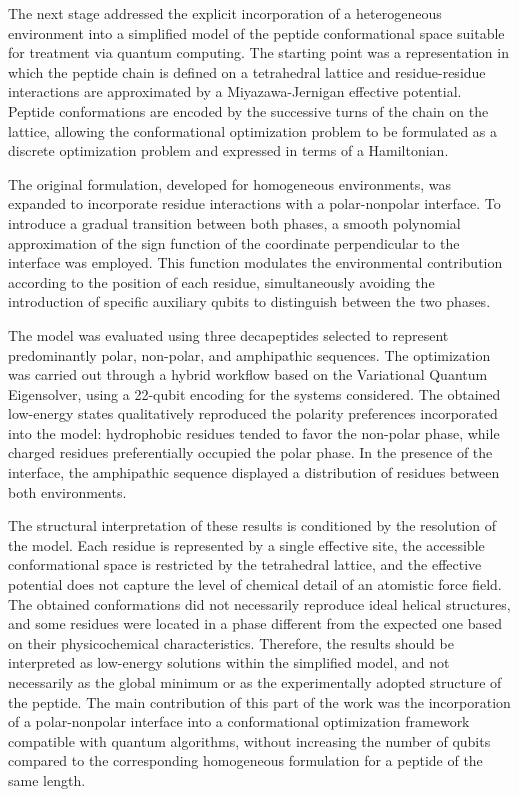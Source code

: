 The next stage addressed the explicit incorporation of a heterogeneous environment into a simplified model of the peptide conformational space suitable for treatment via quantum computing. The starting point was a representation in which the peptide chain is defined on a tetrahedral lattice and residue-residue interactions are approximated by a Miyazawa-Jernigan effective potential. Peptide conformations are encoded by the successive turns of the chain on the lattice, allowing the conformational optimization problem to be formulated as a discrete optimization problem and expressed in terms of a Hamiltonian.

The original formulation, developed for homogeneous environments, was expanded to incorporate residue interactions with a polar-nonpolar interface. To introduce a gradual transition between both phases, a smooth polynomial approximation of the sign function of the coordinate perpendicular to the interface was employed. This function modulates the environmental contribution according to the position of each residue, simultaneously avoiding the introduction of specific auxiliary qubits to distinguish between the two phases.

The model was evaluated using three decapeptides selected to represent predominantly polar, non-polar, and amphipathic sequences. The optimization was carried out through a hybrid workflow based on the Variational Quantum Eigensolver, using a 22-qubit encoding for the systems considered. The obtained low-energy states qualitatively reproduced the polarity preferences incorporated into the model: hydrophobic residues tended to favor the non-polar phase, while charged residues preferentially occupied the polar phase. In the presence of the interface, the amphipathic sequence displayed a distribution of residues between both environments.

The structural interpretation of these results is conditioned by the resolution of the model. Each residue is represented by a single effective site, the accessible conformational space is restricted by the tetrahedral lattice, and the effective potential does not capture the level of chemical detail of an atomistic force field. The obtained conformations did not necessarily reproduce ideal helical structures, and some residues were located in a phase different from the expected one based on their physicochemical characteristics. Therefore, the results should be interpreted as low-energy solutions within the simplified model, and not necessarily as the global minimum or as the experimentally adopted structure of the peptide. The main contribution of this part of the work was the incorporation of a polar-nonpolar interface into a conformational optimization framework compatible with quantum algorithms, without increasing the number of qubits compared to the corresponding homogeneous formulation for a peptide of the same length.

